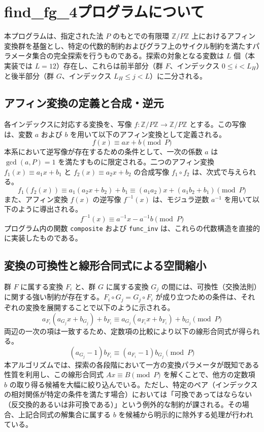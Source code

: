 \documentclass{jsarticle}
\begin{document}
\section{find\_fg\_4プログラムについて}

本プログラムは、指定された法 $P$ のもとでの有限環 $\mathbb{Z}/P\mathbb{Z}$ 上におけるアフィン変換群を基盤とし、特定の代数的制約およびグラフ上のサイクル制約を満たすパラメータ集合の完全探索を行うものである。探索の対象となる変数は $L$ 個（本実装では $L=12$）存在し、これらは前半部分（群 $F$、インデックス $0 \le i < L_H$）と後半部分（群 $G$、インデックス $L_H \le j < L$）に二分される。

\subsection{アフィン変換の定義と合成・逆元}
各インデックスに対応する変換を、写像 $f: \mathbb{Z}/P\mathbb{Z} \to \mathbb{Z}/P\mathbb{Z}$ とする。この写像は、変数 $a$ および $b$ を用いて以下のアフィン変換として定義される。
\[
f(x) \equiv a x + b \pmod P
\]
本系において逆写像が存在するための条件として、一次の係数 $a$ は $\gcd(a, P) = 1$ を満たすものに限定される。二つのアフィン変換 $f_1(x) \equiv a_1 x + b_1$ と $f_2(x) \equiv a_2 x + b_2$ の合成写像 $f_1 \circ f_2$ は、次式で与えられる。
\[
f_1(f_2(x)) \equiv a_1(a_2 x + b_2) + b_1 \equiv (a_1 a_2)x + (a_1 b_2 + b_1) \pmod P
\]
また、アフィン変換 $f(x)$ の逆写像 $f^{-1}(x)$ は、モジュラ逆数 $a^{-1}$ を用いて以下のように導出される。
\[
f^{-1}(x) \equiv a^{-1} x - a^{-1}b \pmod P
\]
プログラム内の関数 \texttt{composite} および \texttt{func\_inv} は、これらの代数構造を直接的に実装したものである。

\subsection{変換の可換性と線形合同式による空間縮小}
群 $F$ に属する変換 $F_i$ と、群 $G$ に属する変換 $G_j$ の間には、可換性（交換法則）に関する強い制約が存在する。$F_i \circ G_j = G_j \circ F_i$ が成り立つための条件は、それぞれの変換を展開することで以下のように示される。
\[
a_{F_i}(a_{G_j} x + b_{G_j}) + b_{F_i} \equiv a_{G_j}(a_{F_i} x + b_{F_i}) + b_{G_j} \pmod P
\]
両辺の一次の項は一致するため、定数項の比較により以下の線形合同式が得られる。
\[
(a_{G_j} - 1)b_{F_i} \equiv (a_{F_i} - 1)b_{G_j} \pmod P
\]
本アルゴリズムでは、探索の各段階において一方の変換パラメータが既知である性質を利用し、この線形合同式 $Ax \equiv B \pmod P$ を解くことで、他方の定数項 $b$ の取り得る候補を大幅に絞り込んでいる。ただし、特定のペア（インデックスの相対関係が特定の条件を満たす場合）においては「可換であってはならない（反交換的あるいは非可換である）」という例外的な制約が課される。その場合、上記合同式の解集合に属する $b$ を候補から明示的に除外する処理が行われている。
\end{document}

